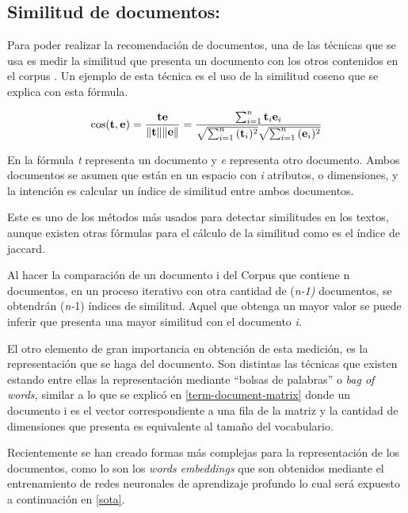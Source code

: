 \documentclass[
  10,
  openany]{book}
\begin{document}
\hypertarget{similitud}{%
\subsection{Similitud de documentos:}\label{similitud}}

Para poder realizar la recomendación de documentos, una de las técnicas que se usa es medir la similitud que presenta un documento con los otros contenidos en el corpus \citep{aggarwal2018} . Un ejemplo de esta técnica es el uso de la similitud coseno que se explica con esta fórmula.

\begin{equation}
\cos ({\bf t},{\bf e})= {{\bf t} {\bf e} \over \|{\bf t}\| \|{\bf e}\|} = \frac{ \sum_{i=1}^{n}{{\bf t}_i{\bf e}_i} }{ \sqrt{\sum_{i=1}^{n}{({\bf t}_i)^2}} \sqrt{\sum_{i=1}^{n}{({\bf e}_i)^2}} }
\end{equation}

En la fórmula \emph{t} representa un documento y \emph{e} representa otro documento. Ambos documentos se asumen que están en un espacio con \emph{i} atributos, o dimensiones, y la intención es calcular un índice de similitud entre ambos documentos.

Este es uno de los métodos más usados para detectar similitudes en los textos, aunque existen otras fórmulas para el cálculo de la similitud como es el índice de jaccard.

Al hacer la comparación de un documento i del Corpus que contiene n documentos, en un proceso iterativo con otra cantidad de (\emph{n-1)} documentos, se obtendrán (\emph{n-}1) índices de similitud. Aquel que obtenga un mayor valor se puede inferir que presenta una mayor similitud con el documento \emph{i.}

El otro elemento de gran importancia en obtención de esta medición, es la representación que se haga del documento. Son distintas las técnicas que existen estando entre ellas la representación mediante ``bolsas de palabras'' o \emph{bag of words,} similar a lo que se explicó en \ref{term-document-matrix} donde un documento i es el vector correspondiente a una fila de la matriz y la cantidad de dimensiones que presenta es equivalente al tamaño del vocabulario.

Recientemente se han creado formas más complejas para la representación de los documentos, como lo son los \emph{words embeddings} que son obtenidos mediante el entrenamiento de redes neuronales de aprendizaje profundo lo cual será expuesto a continuación en \ref{sota}.
\end{document}
